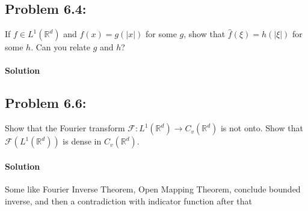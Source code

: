 \documentclass[letterpaper,twoside,11pt]{article}
\theoremstyle{mystyle}
\newcommand{\R}{{\mathbb R}}
\begin{document}
\subsection*{Problem 6.4:}
If $f\in L^1\left( \R^d \right)$ and $f(x) = g\left( \left\vert x\right\vert  \right)$ for some $g$, show that $\hat f\left( \xi \right) = h\left( \left\vert \xi\right\vert \right) $ for some $h$. Can you relate $g$ and $h$? 

\paragraph*{Solution} 



\subsection*{Problem 6.6:}
Show that the Fourier transform $\mathcal F : L^1\left( \R^d \right)\to C_v\left( \R^d \right)$ is not onto. Show that $\mathcal F\left( L^1\left( \R^d \right) \right)$ is dense in $C_v\left( \R^d \right)$. 

\paragraph*{Solution} 
Some like Fourier Inverse Theorem, Open Mapping Theorem, conclude bounded inverse, and then a contradiction with indicator function after that 
\end{document}
